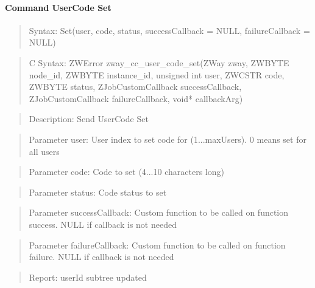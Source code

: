 \paragraph{Command UserCode Set}
\begin{quote}Syntax: Set(user, code, status, successCallback = NULL, failureCallback = NULL)\end{quote}
\begin{quote}C Syntax: ZWError zway\_cc\_user\_code\_set(ZWay zway, ZWBYTE node\_id, ZWBYTE instance\_id, unsigned int user, ZWCSTR code, ZWBYTE status, ZJobCustomCallback successCallback, ZJobCustomCallback failureCallback, void* callbackArg)\end{quote}
\begin{quote}Description: Send UserCode Set\end{quote}
\begin{quote}Parameter user: User index to set code for (1...maxUsers). 0 means set for all users\end{quote}
\begin{quote}Parameter code: Code to set (4...10 characters long)\end{quote}
\begin{quote}Parameter status: Code status to set\end{quote}
\begin{quote}Parameter successCallback: Custom function to be called on function success. NULL if callback is not needed\end{quote}
\begin{quote}Parameter failureCallback: Custom function to be called on function failure. NULL if callback is not needed\end{quote}
\begin{quote}Report: userId subtree updated\end{quote}

